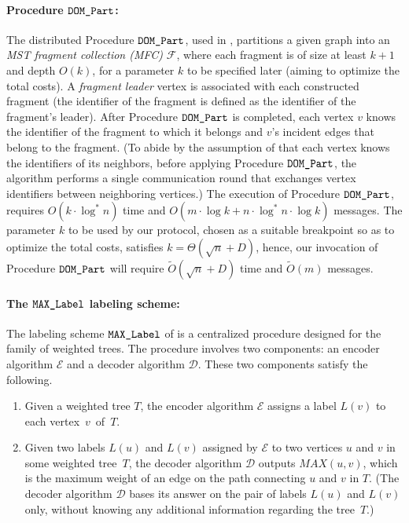 \documentclass[11pt,letter]{article}
\def\DOM{\mbox{\tt DOM\_Part}}
\def\LAB{\mbox{\tt MAX\_Label}}
\def\cD{\mathcal{D}}
\def\cE{\mathcal{E}}
\def\cD{\mathcal{D}}
\def\cF{\mathcal{F}}
\begin{document}
\paragraph{Procedure $\DOM$:} 
The distributed Procedure $\DOM$, used in \cite{KP_98}, partitions a given 
graph into an {\em MST fragment collection (MFC)} $\cF$, where each fragment 
is of size at least $k+1$ and depth $O(k)$, for a parameter $k$ to be 
specified later (aiming to optimize the total costs). 
A {\em fragment leader} vertex is associated with each constructed fragment 
(the identifier of the fragment is defined as the identifier of the 
fragment's leader). 
After Procedure $\DOM$ is completed, 
each vertex $v$ knows the identifier of the fragment 
to which it belongs  and $v$'s incident edges that belong to the fragment.
(To abide by the assumption of \cite{KP_98} that each vertex 
knows the identifiers of its neighbors, before applying Procedure $\DOM$, 
the algorithm performs a single communication round that exchanges 
vertex identifiers between neighboring vertices.) The execution of 
Procedure $\DOM$, requires $O(k\cdot \log ^*n)$ time and 
$O(m\cdot \log k +n\cdot \log^*n\cdot \log k)$ messages. 
The parameter $k$ to be used by our protocol, chosen as a suitable breakpoint 
so as to optimize the total costs, satisfies $k=\Theta(\sqrt n+D)$, 
hence, our invocation of Procedure $\DOM$ will require 
$\tilde{O}(\sqrt{n}+D)$ time and $\tilde{O}(m)$ messages.

\paragraph{The $\LAB$  labeling scheme:} 
The labeling scheme $\LAB$ 
of \cite{KKKP_05} is a centralized procedure designed for the family of 
weighted trees. The procedure involves two components: 
an encoder algorithm $\cE$ and 
a decoder algorithm $\cD$. These two components satisfy the following.
\begin{enumerate}
\item Given a weighted tree $T$, the encoder algorithm $\mathcal E$ 
assigns a label $L(v)$ to each vertex~$v$~of~$T$.
\item Given two labels $L(u)$ and $L(v)$ assigned by $\mathcal E$ to two vertices $u$ and $v$ in some weighted tree~$T$, the decoder 
algorithm $\mathcal D$ outputs $MAX(u,v)$, which is the maximum weight 
of an edge on the path connecting $u$ and $v$ in $T$. (The decoder 
algorithm $\mathcal D$ bases its answer on the pair of labels   $L(u)$ and $L(v)$ only, without knowing any additional information regarding the tree~$T$.)
\end{enumerate} 
\end{document}
